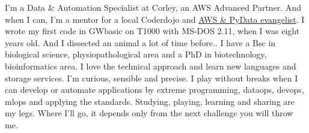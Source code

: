 \documentclass[8pt]{stackoverflow-upgraded-version} %
\begin{document}
\begin{minipage}[t]{0.45\textwidth} %
	\vspace{-\baselineskip} %
	I'm a Data \& Automation Specialist at Corley, an AWS Advanced Partner.
	And when I can, I'm a mentor for a local Coderdojo and \href{https://alessandra.bilardi.net/resume/activities/roles#speaker}{AWS \& PyData evangelist}.
	I wrote my first code in GWbasic on T1000 with MS-DOS 2.11, when I was eight years old. And I dissected an animal a lot of time before..
	I have a Bsc in biological science, physiopathological area and a PhD in biotechnology, bioinformatics area.
	I love the technical approach and learn new languages and storage services. I'm curious, sensible and precise.
	I play without breaks when I can develop or automate applications by extreme programming, dataops, devops, mlops and applying the standards.
	Studying, playing, learning and sharing are my legs. Where I'll go, it depends only from the next challenge you will throw me.
	\\
\end{minipage}
\hfill %
\begin{minipage}[t]{0.5\textwidth} %
	\vspace{-26pt} %
	\begin{barchart}{5.5}
	\end{barchart}
	\\
\end{minipage}

\end{document}

